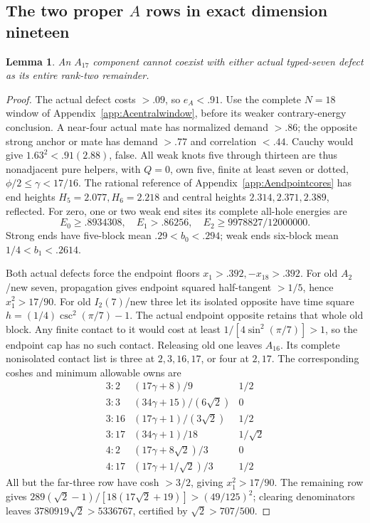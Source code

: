 \documentclass[11pt]{article}
\newtheorem{lemma}[theorem]{Lemma}
\theoremstyle{definition}
\theoremstyle{remark}
\begin{document}
\subsection{The two proper $A$ rows in exact dimension nineteen}
\begin{lemma}\label{app:tail:lem:A17typed}
An $A_{17}$ component cannot coexist with either actual typed-seven
defect as its entire rank-two remainder.
\end{lemma}
\begin{proof}
The actual defect costs $>.09$, so $e_A<.91$. Use the complete
$N=18$ window of Appendix~\ref{app:Acentralwindow}, before its
weaker contrary-energy conclusion. A near-four actual mate has
normalized demand $>.86$; the opposite strong anchor or mate
has demand $>.77$ and correlation $<.44$.
Cauchy would give $1.63^2<.91(2.88)$, false.
All weak knots five through thirteen are thus nonadjacent pure
helpers, with $Q=0$, own five, finite at least seven or dotted,
$\phi/2\le\gamma<17/16$.
The rational reference of Appendix~\ref{app:Aendpointcores}
has end heights $H_5=2.077,H_6=2.218$ and central heights
$2.314,2.371,2.389$, reflected. For zero, one or two weak end
sites its complete all-hole energies are
\[
 E_0\ge.8934308,\quad E_1>.86256,\quad
 E_2\ge9978827/12000000.
\]
Strong ends have five-block mean $.29<b_0<.294$;
weak ends six-block mean $1/4<b_1<.2614$.

Both actual defects force the endpoint floors
$x_1>.392,-x_{18}>.392$.
For old $A_2$/new seven, propagation gives endpoint squared
half-tangent $>1/5$, hence $x_1^2>17/90$.
For old $I_2(7)$/new three let its isolated opposite have
time square $h=(1/4)\csc^2(\pi/7)-1$.
The actual endpoint opposite retains that whole old block.
Any finite contact to it would cost at least
$1/[4\sin^2(\pi/7)]>1$, so the endpoint cap has no such contact.
Releasing old one leaves $A_{16}$. Its complete nonisolated
contact list is three at $2,3,16,17$, or four at $2,17$.
The corresponding coshes and minimum allowable owns are
\[
\begin{array}{c|c|c}
3:2&(17\gamma+8)/9&1/2\\
3:3&(34\gamma+15)/(6\sqrt2)&0\\
3:16&(17\gamma+1)/(3\sqrt2)&1/2\\
3:17&(34\gamma+1)/18&1/\sqrt2\\
4:2&(17\gamma+8\sqrt2)/3&0\\
4:17&(17\gamma+1/\sqrt2)/3&1/2
\end{array}
\]
All but the far-three row have cosh $>3/2$, giving
$x_1^2>17/90$. The remaining row gives
$289(\sqrt2-1)/[18(17\sqrt2+19)]>(49/125)^2$;
clearing denominators leaves
$3780919\sqrt2>5336767$, certified by $\sqrt2>707/500$.


\end{proof}
\end{document}
